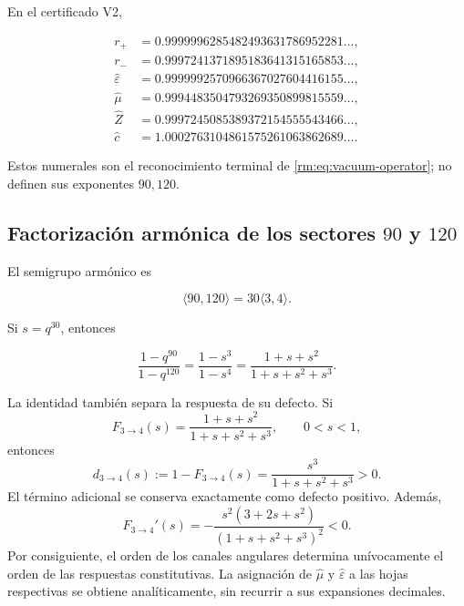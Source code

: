En el certificado V2,

\begin{align*}
r_+&=0.9999996285482493631786952281\ldots,\\
r_-&=0.9997241371895183641315165853\ldots,\\
\widehat\varepsilon&=0.9999992570966367027604416155\ldots,\\
\widehat\mu&=0.9994483504793269350899815559\ldots,\\
\widehat Z&=0.9997245085389372154555543466\ldots,\\
\widehat c&=1.0002763104861575261063862689\ldots.
\end{align*}

Estos numerales son el reconocimiento terminal de \cref{rm:eq:vacuum-operator}; no definen sus exponentes \(90,120\).

\subsection{Factorizaci\'on arm\'onica de los sectores \texorpdfstring{\(90\)}{90} y \texorpdfstring{\(120\)}{120}}

El semigrupo arm\'onico es

\[
\langle90,120\rangle=30\langle3,4\rangle.
\]

Si \(s=q^{30}\), entonces

\begin{equation}
\frac{1-q^{90}}{1-q^{120}}
=\frac{1-s^3}{1-s^4}
=\frac{1+s+s^2}{1+s+s^2+s^3}.
\label{rm:eq:three-four-completion}
\end{equation}

La identidad tambi\'en separa la respuesta de su defecto. Si
\[
F_{3\to4}(s)=\frac{1+s+s^2}{1+s+s^2+s^3},
\qquad 0<s<1,
\]
entonces
\begin{equation}
d_{3\to4}(s):=1-F_{3\to4}(s)
=\frac{s^3}{1+s+s^2+s^3}>0.
\label{rm:eq:vacuum-defect34}
\end{equation}
El t\'ermino adicional se conserva exactamente como defecto
positivo. Adem\'as,
\begin{equation}
F_{3\to4}'(s)
=-\frac{s^2(3+2s+s^2)}{(1+s+s^2+s^3)^2}<0.
\label{rm:eq:vacuum-monotonic34}
\end{equation}
Por consiguiente, el orden de los canales angulares determina un\'ivocamente
el orden de las respuestas constitutivas. La asignaci\'on de
\(\widehat\mu\) y \(\widehat\varepsilon\) a las hojas respectivas se obtiene
anal\'iticamente, sin recurrir a sus expansiones decimales.

